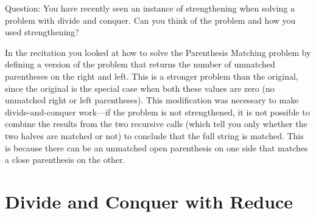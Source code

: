 \begin{cluster}
\label{grp:tch:design::dc::question}

\begin{teachnote}
\label{tch:design::dc::question}
Question:
You have recently seen an instance of strengthening when solving
a problem with divide and conquer. Can you think of the problem and
how you used strengthening?

In the recitation you looked at how to solve the Parenthesis Matching
problem by defining a version of the problem that returns the number
of unmatched parentheses on the right and left.  This is a stronger
problem than the original, since the original is the special case when
both these values are zero (no unmatched right or left parentheses).
This modification was necessary to make divide-and-conquer work---if
the problem is not strengthened, it is not possible to combine the
results from the two recursive calls (which tell you only whether the
two halves are matched or not) to conclude that the full string is
matched.  This is because there can be an unmatched open parenthesis
on one side that matches a close parenthesis on the other.

\end{teachnote}
\end{cluster}


\section{Divide and Conquer with Reduce}
\label{sec:design::dc::with-reduce}

